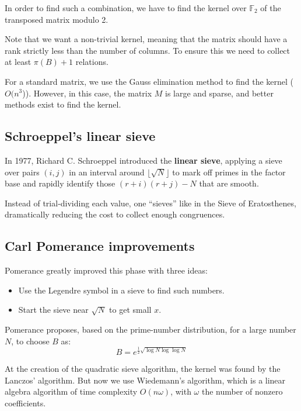 \documentclass[a4paper, 11pt]{article}
\begin{document}
In order to find such a combination, we have to find the kernel over $\mathbb{F}_2$ of the transposed matrix modulo 2.

Note that we want a non-trivial kernel, meaning that the matrix should have a rank strictly less than the number of columns. To ensure this we need to collect at least $\pi(B)+1$ relations.

For a standard matrix, we use the Gauss elimination method to find the kernel
($O(n^3$)). However, in this case, the matrix $M$ is large and sparse, and better methods exist to find the kernel.

\subsection{Schroeppel's linear sieve}
In 1977, Richard C. Schroeppel introduced the \textbf{linear sieve}, applying a sieve over pairs $(i,j)$ in an interval around $\lfloor \sqrt{N} \rfloor$ to mark off primes in the factor base and rapidly identify those $(r+i)(r+j)-N$ that are smooth. 

Instead of trial-dividing each value, one “sieves” like in the Sieve of Eratosthenes, dramatically reducing the cost to collect enough congruences. 

\subsection{Carl Pomerance improvements}

Pomerance greatly improved this phase with three ideas:
\begin{itemize}
    \item Use the Legendre symbol in a sieve to find such numbers.
    \item Start the sieve near $\sqrt{N}$ to get small $x$.
\end{itemize}   

Pomerance proposes, based on the prime-number distribution, for a large number $N$, to choose $B$ as:
\begin{equation}
    B = e^{\frac{1}{2}  \sqrt{\log N \log \log N}}
\end{equation}

At the creation of the quadratic sieve algorithm, the kernel was found by the Lanczos' algorithm. But now we use Wiedemann's algorithm, which is a linear algebra algorithm of time complexity $O(n\omega)$, with $\omega$ the number of nonzero coefficients.

\newpage
\end{document}
